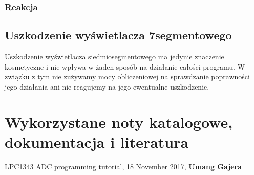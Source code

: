 \documentclass[a4paper,12pt,twoside]{article}
\theoremstyle{plain}
\theoremstyle{definition}
\theoremstyle{remark}
\begin{document}
	\subsubsection{Reakcja}
	
	\subsection{Uszkodzenie wyświetlacza 7segmentowego}
	Uszkodzenie wyświetlacza siedmiosegmentowego ma jedynie znaczenie kosmetyczne i nie wpływa w żaden sposób na działanie całości programu. W związku z tym nie zużywamy mocy obliczeniowej na sprawdzanie poprawności jego działania ani nie reagujemy na jego ewentualne uszkodzenie.
\section{Wykorzystane noty katalogowe, dokumentacja i literatura}
		
		
\begin{thebibliography}{abcd}
{LPC1343 ADC programming tutorial},
	{18 November 2017},
	\textbf{Umang Gajera}
\end{thebibliography}
\end{document}
